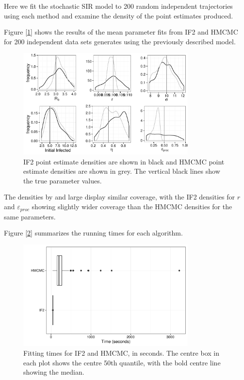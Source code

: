 	Here we fit the stochastic SIR model to 200 random independent trajectories using each method and examine the density of the point estimates produced.

	Figure [\ref{combinedmulti}] shows the results of the mean parameter fits from IF2 and HMCMC for 200 independent data sets generates using the previously described model.

    \begin{figure}
        \centering
        \captionsetup{width=.8\linewidth}
        \includegraphics[width=0.8\textwidth]{./images/combined-multi.pdf}
        \caption{IF2 point estimate densities are shown in black and HMCMC point estimate densities are shown in grey. The vertical black lines show the true parameter values. \label{combinedmulti}}
    \end{figure}

    The densities by and large display similar coverage, with the IF2 densities for $r$ and $\varepsilon_{proc}$ showing slightly wider coverage than the HMCMC densities for the same parameters.

    Figure [\ref{sc1timeplot}] summarizes the running times for each algorithm.

	\begin{figure}
        \centering
        \captionsetup{width=.8\linewidth}
        \includegraphics[width=0.8\textwidth]{./images/timeplot.pdf}
        \caption{Fitting times for IF2 and HMCMC, in seconds. The centre box in each plot shows the centre 50th quantile, with the bold centre line showing the median. \label{sc1timeplot}}
    \end{figure}

